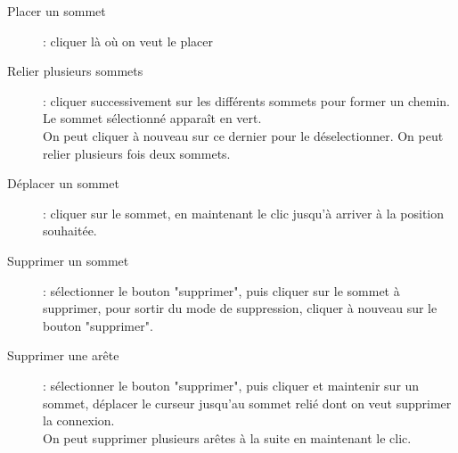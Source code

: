 \documentclass[12pt]{article}
\begin{document}
\begin{description}
    \item[Placer un sommet]:
    cliquer là où on veut le placer

    \item[Relier plusieurs sommets]:
    cliquer successivement sur les différents sommets pour former un chemin. Le sommet sélectionné apparaît en vert.\\
    On peut cliquer à nouveau sur ce dernier pour le déselectionner. On peut relier plusieurs fois deux sommets.

    \item[Déplacer un sommet]:
    cliquer sur le sommet, en maintenant le clic jusqu'à arriver à la position souhaitée.

    \item[Supprimer un sommet]:
    sélectionner le bouton "supprimer", puis cliquer sur le sommet à supprimer, pour sortir du mode de suppression, cliquer à nouveau sur le bouton "supprimer".

    \item[Supprimer une arête]:
    sélectionner le bouton "supprimer", puis cliquer et maintenir sur un sommet, déplacer le curseur jusqu'au sommet relié dont on veut supprimer la connexion.\\
    On peut supprimer plusieurs arêtes à la suite en maintenant le clic.

\end{description}
\end{document}
